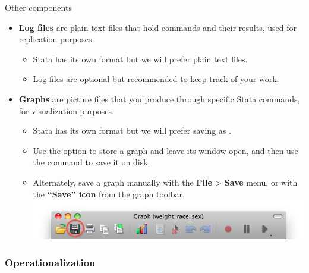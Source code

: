 \documentclass{beamer}
\begin{document}
	\begin{frame}[t]{Other components}
			
		\begin{itemize}
		
			\item \textbf{Log files} are plain text files that hold commands and their results, used for replication purposes.
			
			\begin{itemize}
				\item Stata has its own  format but we will prefer plain text  files.
				\item Log files are optional but recommended to keep track of your work.
			\end{itemize}	
			
			\item \textbf{Graphs} are picture files that you produce through specific Stata commands, for visualization purposes.
			
			\begin{itemize}
				\item Stata has its own  format but we will prefer saving as .
				\item Use the  option to store a graph and leave its window open, and then use the  command to save it on disk.
				\item Alternately, save a graph manually with the \textbf{File $\triangleright$ Save} menu, or with the \textbf{``Save'' icon} from the graph toolbar.
				\includegraphics[width=.9\textwidth]{images/scrn-savegraph.jpg}
			\end{itemize}	
					
		\end{itemize}
			
	\end{frame}	

	\subsubsection{Operationalization}
	
\end{document}
